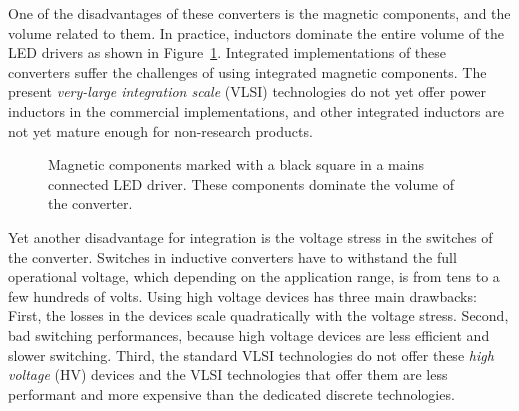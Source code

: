 One of the disadvantages of these converters is the magnetic components, and the volume related to them. In practice, inductors dominate the entire volume of the LED drivers as shown in Figure~\ref{fig:smps_driver}. Integrated implementations of these converters suffer the challenges of using integrated magnetic components. The present \emph{very-large integration scale} (VLSI) technologies do not yet offer power inductors in the commercial implementations, and other integrated inductors are not yet mature enough for non-research products.

\begin{figure}
\centering
{}
\caption{Magnetic components marked with a black square in a mains connected LED driver. These components dominate the volume of the converter.}
\label{fig:smps_driver}
\end{figure}

Yet another disadvantage for integration is the voltage stress in the switches of the converter. Switches in inductive converters have to withstand the full operational voltage, which depending on the application range, is from tens to a few hundreds of volts. Using high voltage devices has three main drawbacks: First, the losses in the devices scale quadratically with the voltage  stress. Second, bad switching performances, because high voltage devices are less efficient and slower switching. Third, the standard VLSI technologies do not offer these \emph{high voltage} (HV) devices and the VLSI technologies that offer them are less performant and more expensive than the dedicated discrete technologies.

